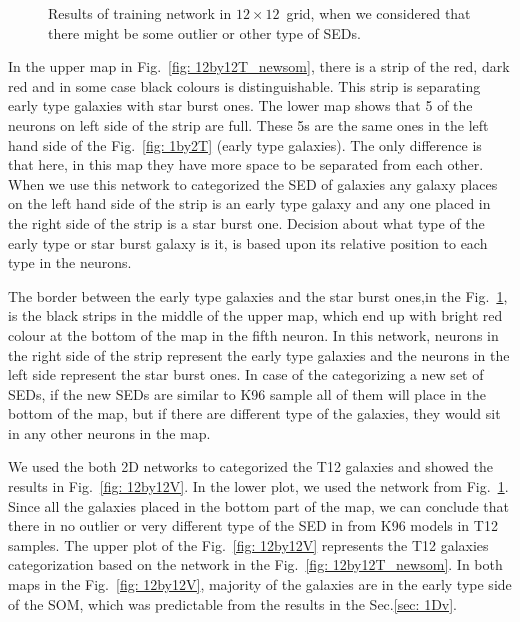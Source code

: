\begin{figure}
\begin{subfigure}[b]{0.5\textwidth}
        \end{subfigure}
        \caption{Results of training network in $12\times12$~grid, when we considered that there might be some outlier or other type of SEDs.}
        \label{fig: 12by12T_selforg}
    \end{figure}
    
    In the upper map in Fig.~\ref{fig: 12by12T_newsom}, there is a strip of the red, dark red and in some case black colours is distinguishable. 
    This strip is separating early type galaxies with star burst ones.
    The lower map shows that 5 of the neurons on left side of the strip are full. 
    These 5s are the same ones in the left hand side of the Fig.~\ref{fig: 1by2T} (early type galaxies).
    The only difference is that here, in this map they have more space to be separated from each other.
    When we use this network to categorized the SED of galaxies any galaxy places on the left hand side of the strip is an early type galaxy and any one placed in the right side of the strip is a star burst one.
    Decision about what type of the early type or star burst galaxy is it, is based upon its relative position to each type in the neurons.
    
    The border between the early type galaxies and the star burst ones,in the Fig.~\ref{fig: 12by12T_selforg}, is the black strips in the middle of the upper map, which end up with bright red colour at the bottom of the map in the fifth neuron.
    In this network, neurons in the right side of the strip represent the early type galaxies and the neurons in the left side represent the star burst ones.
    In case of the categorizing a new set of SEDs, if the new SEDs are similar to K96 sample all of them will place in the bottom of the map, but if there are different type of the galaxies, they would sit in any other neurons in the map.
    
    We used the both 2D networks to categorized the T12 galaxies and showed the results in Fig.~\ref{fig: 12by12V}.
    In the lower plot, we used the network from Fig.~\ref{fig: 12by12T_selforg}.
    Since all the galaxies placed in the bottom part of the map, we can conclude that there in no outlier or very different type of the SED in from K96 models in T12 samples.
    The upper plot of the Fig.~\ref{fig: 12by12V} represents the T12 galaxies categorization based on the network in the Fig.~\ref{fig: 12by12T_newsom}. 
    In both maps in the Fig.~\ref{fig: 12by12V}, majority of the galaxies are in the early type side of the SOM, which was predictable from the results in the Sec.\ref{sec: 1Dv}.
    
